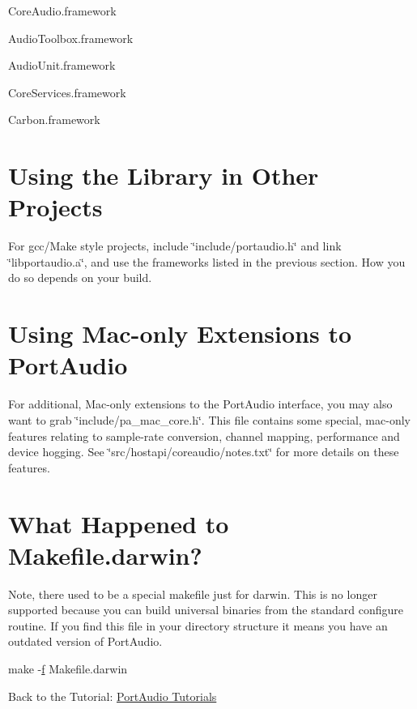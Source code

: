 \begin{DoxyItemize}
\item Core\+Audio.\+framework
\item Audio\+Toolbox.\+framework
\item Audio\+Unit.\+framework
\item Core\+Services.\+framework
\item Carbon.\+framework
\end{DoxyItemize}\hypertarget{compile_mac_coreaudio_comp_mac_ca_5}{}\section{Using the Library in Other Projects}\label{compile_mac_coreaudio_comp_mac_ca_5}
For gcc/\+Make style projects, include \char`\"{}include/portaudio.\+h\char`\"{} and link \char`\"{}libportaudio.\+a\char`\"{}, and use the frameworks listed in the previous section. How you do so depends on your build.\hypertarget{compile_mac_coreaudio_comp_mac_ca_6}{}\section{Using Mac-\/only Extensions to Port\+Audio}\label{compile_mac_coreaudio_comp_mac_ca_6}
For additional, Mac-\/only extensions to the Port\+Audio interface, you may also want to grab \char`\"{}include/pa\+\_\+mac\+\_\+core.\+h\char`\"{}. This file contains some special, mac-\/only features relating to sample-\/rate conversion, channel mapping, performance and device hogging. See \char`\"{}src/hostapi/coreaudio/notes.\+txt\char`\"{} for more details on these features.\hypertarget{compile_mac_coreaudio_comp_mac_ca_7}{}\section{What Happened to Makefile.\+darwin?}\label{compile_mac_coreaudio_comp_mac_ca_7}
Note, there used to be a special makefile just for darwin. This is no longer supported because you can build universal binaries from the standard configure routine. If you find this file in your directory structure it means you have an outdated version of Port\+Audio.


\begin{DoxyCode}
make -\hyperlink{rfft2d_test_m_l_8m_aacd36fb6ac9ce14cec71f2ca852524d4}{f} Makefile.darwin
\end{DoxyCode}


Back to the Tutorial\+: \hyperlink{tutorial_start}{Port\+Audio Tutorials} 